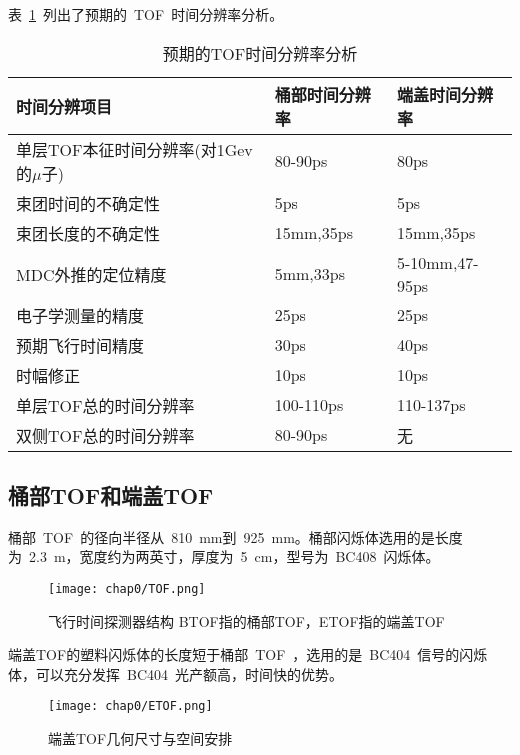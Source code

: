 表~\ref{tbl:TOF-expect-sigma}~列出了预期的~TOF~时间分辨率分析。
\begin{table}[h]
    \centering
    \caption{\label{tbl:TOF-expect-sigma} 预期的TOF时间分辨率分析}
    \footnotesize
    \begin{tabular}{lll}
        \hline
        时间分辨项目& 桶部时间分辨率& 端盖时间分辨率 \\
        \hline
        单层TOF本征时间分辨率(对1Gev的$\mu$子)& 80-90ps&        80ps \\
        束团时间的不确定性&                     5ps&            5ps \\
        束团长度的不确定性&                     15mm,35ps&      15mm,35ps\\
        MDC外推的定位精度&                      5mm,33ps&       5-10mm,47-95ps\\
        电子学测量的精度&                       25ps&           25ps\\
        预期飞行时间精度&                       30ps&           40ps\\
        时幅修正&                               10ps&          10ps  \\
		单层TOF总的时间分辨率&                   100-110ps&     110-137ps           \\
		双侧TOF总的时间分辨率&                   80-90ps&       无                \\       
        \hline
    \end{tabular}
\end{table}

\subsection{桶部TOF和端盖TOF}
桶部~TOF~的径向半径从~810~mm到~925~mm。桶部闪烁体选用的是长度为~2.3~m，宽度约为两英寸，厚度为~5~cm，型号为~BC408~闪烁体。
\begin{figure}[!h]
  \centering
  \texttt{[image: chap0/TOF.png]}
  \caption{飞行时间探测器结构 BTOF指的桶部TOF，ETOF指的端盖TOF}
  \label{fig:TOF}
\end{figure}

端盖TOF的塑料闪烁体的长度短于桶部~TOF~，选用的是~BC404~信号的闪烁体，可以充分发挥~BC404~光产额高，时间快的优势。
\begin{figure}[!h]
  \centering
  \texttt{[image: chap0/ETOF.png]}
  \caption{端盖TOF几何尺寸与空间安排}
  \label{fig:ETOF}
\end{figure}
